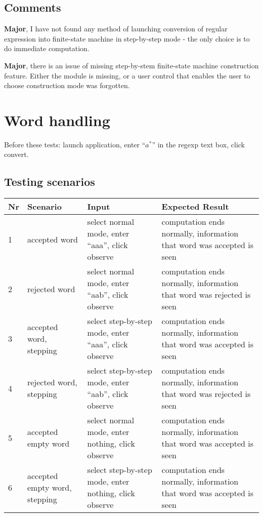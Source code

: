 \documentclass{article}
\newcommand{\errormajor}{\textbf{Major}, }
\begin{document}
\subsection{Comments}
\errormajor I have not found any method of launching conversion of regular expression into
finite-state machine in step-by-step mode - the only choice is to do immediate computation.

\errormajor there is an issue of missing step-by-stem finite-state machine construction feature.
Either the module is missing, or a user control that enables the user to choose construction mode
was forgotten.

\newpage

\section{Word handling}
Before these tests: launch application, enter ``$ a^* $'' in the regexp text box, click convert.

\subsection{Testing scenarios}

\begin{center}
\begin{tabularx}{\textwidth}{llXX}
\toprule
\textbf{Nr} & \textbf{Scenario} & \textbf{Input} & \textbf{Expected Result}  \\
\midrule
1 & accepted word
& select normal mode, enter ``aaa'', click observe
& computation ends normally, information that word was accepted is seen \\
\midrule
2 & rejected word
& select normal mode, enter ``aab'', click observe
& computation ends normally, information that word was rejected is seen \\
\midrule
3 & accepted word, stepping
& select step-by-step mode, enter ``aaa'', click observe
& computation ends normally, information that word was accepted is seen \\
\midrule
4 & rejected word, stepping
& select step-by-step mode, enter ``aab'', click observe
& computation ends normally, information that word was rejected is seen \\
\midrule
5 & accepted empty word
& select normal mode, enter nothing, click observe
& computation ends normally, information that word was accepted is seen \\
\midrule
6 & accepted empty word, stepping
& select step-by-step mode, enter nothing, click observe
& computation ends normally, information that word was accepted is seen \\
\bottomrule
\end{tabularx}
\end{center}
\end{document}
